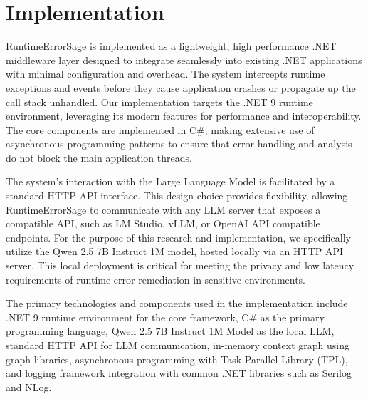 \section{Implementation}\label{sec:implementation}
RuntimeErrorSage is implemented as a lightweight, high performance .NET middleware layer designed to integrate seamlessly into existing .NET applications with minimal configuration and overhead. The system intercepts runtime exceptions and events before they cause application crashes or propagate up the call stack unhandled. Our implementation targets the .NET 9 runtime environment, leveraging its modern features for performance and interoperability. The core components are implemented in C\#, making extensive use of asynchronous programming patterns to ensure that error handling and analysis do not block the main application threads.

The system's interaction with the Large Language Model is facilitated by a standard HTTP API interface. This design choice provides flexibility, allowing RuntimeErrorSage to communicate with any LLM server that exposes a compatible API, such as LM Studio, vLLM, or OpenAI API compatible endpoints. For the purpose of this research and implementation, we specifically utilize the Qwen 2.5 7B Instruct 1M model, hosted locally via an HTTP API server. This local deployment is critical for meeting the privacy and low latency requirements of runtime error remediation in sensitive environments.

The primary technologies and components used in the implementation include .NET 9 runtime environment for the core framework, C\# as the primary programming language, Qwen 2.5 7B Instruct 1M Model as the local LLM, standard HTTP API for LLM communication, in-memory context graph using graph libraries, asynchronous programming with Task Parallel Library (TPL), and logging framework integration with common .NET libraries such as Serilog and NLog.

